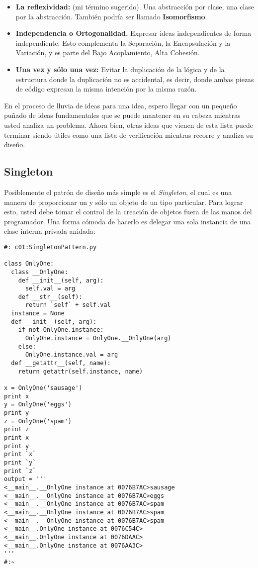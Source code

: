 \begin{itemize}
    \item \textbf{La reflexividad:} (mi término sugerido). Una abstracción por clase, una clase por la abstracción. También podría ser llamado \textbf{Isomorfismo}.
    
    \item \textbf{Independencia o Ortogonalidad.} Expresar ideas independientes de forma independiente. Esto complementa la Separación, la Encapsulación y la Variación, y es parte del Bajo Acoplamiento, Alta Cohesión.
    
    \item \textbf{Una vez y sólo una vez:} Evitar la duplicación de la lógica y de la estructura donde la duplicación no es accidental, es decir, donde ambas piezas de código expresan la misma intención por la misma razón.

\end{itemize}

En el proceso de lluvia de ideas para una idea, espero llegar con un pequeño puñado de ideas fundamentales que se puede mantener en su cabeza mientras usted analiza un problema. Ahora bien, otras ideas que vienen de esta lista puede terminar siendo útiles como una lista de verificación mientras recorre y analiza su diseño.  \newline

\subsection*{Singleton}
\label{subsec:singl}

Posiblemente el patrón de diseño más simple es el \textit{Singleton}, 
el cual es una manera de proporcionar un y sólo un objeto de un tipo particular. Para lograr esto, usted debe tomar el control de la creación de objetos fuera de las manos del programador. Una forma cómoda de hacerlo es delegar una sola instancia de una clase interna privada anidada:    \newline %

 \begin{lstlisting}
#: c01:SingletonPattern.py 

class OnlyOne: 
  class __OnlyOne: 
    def __init__(self, arg): 
      self.val = arg 
    def __str__(self): 
      return `self` + self.val 
  instance = None 
  def __init__(self, arg): 
    if not OnlyOne.instance: 
      OnlyOne.instance = OnlyOne.__OnlyOne(arg) 
    else: 
      OnlyOne.instance.val = arg 
  def __getattr__(self, name): 
    return getattr(self.instance, name) 
    
x = OnlyOne('sausage') 
print x 
y = OnlyOne('eggs') 
print y 
z = OnlyOne('spam') 
print z 
print x 
print y 
print `x` 
print `y` 
print `z` 
output = ''' 
<__main__.__OnlyOne instance at 0076B7AC>sausage 
<__main__.__OnlyOne instance at 0076B7AC>eggs 
<__main__.__OnlyOne instance at 0076B7AC>spam 
<__main__.__OnlyOne instance at 0076B7AC>spam 
<__main__.__OnlyOne instance at 0076B7AC>spam 
<__main__.OnlyOne instance at 0076C54C> 
<__main__.OnlyOne instance at 0076DAAC> 
<__main__.OnlyOne instance at 0076AA3C> 
''' 
#:~ 
 \end{lstlisting}

